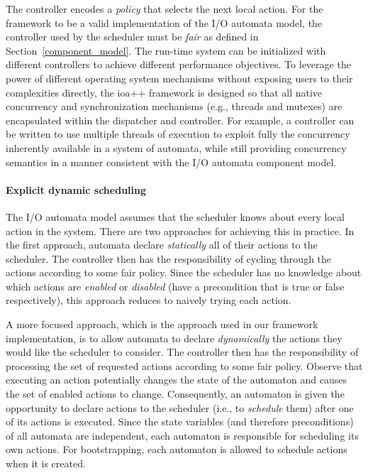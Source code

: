 The controller encodes a \emph{policy} that selects the next local action.
For the framework to be a valid implementation of the I/O automata model, the controller used by the scheduler must be \emph{fair} as defined in Section~\ref{component_model}.
The run-time system can be initialized with different controllers to achieve different performance objectives.
To leverage the power of different operating system mechanisms without exposing users to their complexities directly, the ioa++ framework is designed so that all native concurrency and synchronization mechanisms (e.g., threads and mutexes) are encapsulated within the dispatcher and controller.
For example, a controller can be written to use multiple threads of execution to exploit fully the concurrency inherently available in a system of automata,
while still providing concurrency semantics in a manner consistent with the I/O automata component model.

\paragraph*{Explicit dynamic scheduling}
The I/O automata model assumes that the scheduler knows about every local action in the system.
There are two approaches for achieving this in practice.
In the first approach, automata declare \emph{statically} all of their actions to the scheduler.
The controller then has the responsibility of cycling through the actions according to some fair policy.
Since the scheduler has no knowledge about which actions are \emph{enabled} or \emph{disabled} (have a precondition that is true or false respectively), this approach reduces to naively trying each action.

A more focused approach, which is the approach used in our framework implementation, is to allow automata to declare \emph{dynamically} the actions they would like the scheduler to consider.
The controller then has the responsibility of processing the set of requested actions according to some fair policy.
Observe that executing an action potentially changes the state of the automaton and causes the set of enabled actions to change.
Consequently, an automaton is given the opportunity to declare actions to the scheduler (i.e., to \emph{schedule} them) after one of its actions is executed.
Since the state variables (and therefore preconditions) of all automata are independent, each automaton is responsible for scheduling its own actions.
For bootstrapping, each automaton is allowed to schedule actions when it is created.

